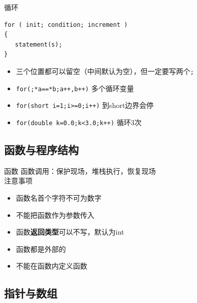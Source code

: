\documentclass[UTF8]{ctexbeamer}
\begin{document}
\begin{frame}[fragile]{循环}
\begin{lstlisting}
for ( init; condition; increment )
{
   statement(s);
}
\end{lstlisting}
\begin{itemize}
	\item 三个位置都可以留空（中间默认为空），但一定要写两个\verb';'
	\item \verb'for(;*a==*b;a++,b++)' 多个循环变量
	\item \verb'for(short i=1;i>=0;i++)' 到short边界会停
	\item \verb'for(double k=0.0;k<3.0;k++)' 循环3次
\end{itemize}
\end{frame}

\subsection{函数与程序结构}
\begin{frame}
\subsectionpage
\end{frame}

\begin{frame}{函数}
函数调用：保护现场，堆栈执行，恢复现场\\
注意事项
\begin{itemize}[<+->]
	\item 函数名首个字符不可为数字
	\item 不能把函数作为参数传入
	\item 函数\textbf{返回类型}可以不写，默认为int
	\item 函数都是外部的
	\item 不能在函数内定义函数
\end{itemize}
\end{frame}

\subsection{指针与数组}
\begin{frame}
\subsectionpage
\end{frame}
\end{document}
